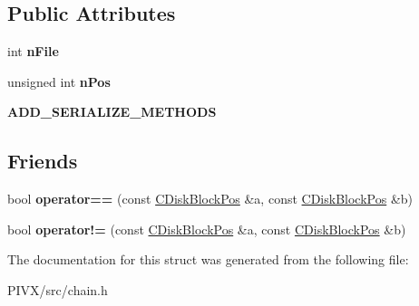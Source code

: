 \subsection*{Public Attributes}
\begin{DoxyCompactItemize}
\item 
\mbox{\label{struct_c_disk_block_pos_a09f30dab5c02fbdea8a17f9bcee5aac8}} 
int {\bfseries n\+File}
\item 
\mbox{\label{struct_c_disk_block_pos_a9b4b5e149b655ac5c22d05883b5bca0e}} 
unsigned int {\bfseries n\+Pos}
\item 
\mbox{\label{struct_c_disk_block_pos_a958cd730b290bbb0153d514c56517590}} 
{\bfseries A\+D\+D\+\_\+\+S\+E\+R\+I\+A\+L\+I\+Z\+E\+\_\+\+M\+E\+T\+H\+O\+DS}
\end{DoxyCompactItemize}
\subsection*{Friends}
\begin{DoxyCompactItemize}
\item 
\mbox{\label{struct_c_disk_block_pos_a04787eb60da48b80e0f7fb402c6896fe}} 
bool {\bfseries operator==} (const \mbox{\hyperlink{struct_c_disk_block_pos}{C\+Disk\+Block\+Pos}} \&a, const \mbox{\hyperlink{struct_c_disk_block_pos}{C\+Disk\+Block\+Pos}} \&b)
\item 
\mbox{\label{struct_c_disk_block_pos_af77481af6cf1d32788ba67c29cc061b5}} 
bool {\bfseries operator!=} (const \mbox{\hyperlink{struct_c_disk_block_pos}{C\+Disk\+Block\+Pos}} \&a, const \mbox{\hyperlink{struct_c_disk_block_pos}{C\+Disk\+Block\+Pos}} \&b)
\end{DoxyCompactItemize}


The documentation for this struct was generated from the following file\+:\begin{DoxyCompactItemize}
\item 
P\+I\+V\+X/src/chain.\+h\end{DoxyCompactItemize}
